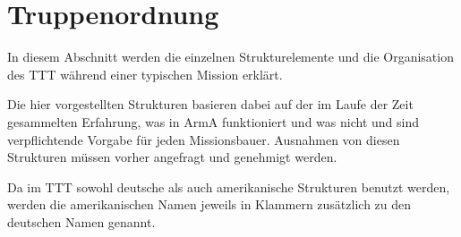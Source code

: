 \chapter{Truppenordnung}
In diesem Abschnitt werden die einzelnen Strukturelemente und die Organisation des \ac{TTT} während einer typischen Mission erklärt.\par
Die hier vorgestellten Strukturen basieren dabei auf der im Laufe der Zeit gesammelten Erfahrung, was in ArmA funktioniert und was nicht und sind verpflichtende Vorgabe für jeden Missionsbauer. Ausnahmen von diesen Strukturen müssen vorher angefragt und genehmigt werden.\par
Da im \ac{TTT} sowohl deutsche als auch amerikanische Strukturen benutzt werden, werden die amerikanischen Namen jeweils in Klammern zusätzlich zu den deutschen Namen genannt.











